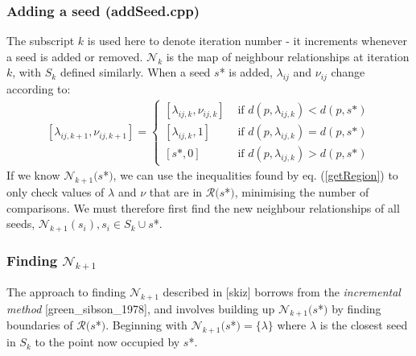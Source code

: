 \documentclass[12pt, report, a4paper, titlepage]{article}
\numberwithin{equation}{section}
\newcommand*{\citen}{}%
\DeclareRobustCommand*{\citen}[1]{%
  \begingroup
    \romannumeral-`\x %
    \setcitestyle{numbers}%
    \cite{#1}%
  \endgroup
}
\begin{document}
\subsubsection{Adding a seed (addSeed.cpp)}

The subscript $k$ is used here to denote iteration number - it increments whenever a seed is added or removed. $\mathcal{N}_k$ is the map of neighbour relationships at iteration $k$, with $S_k$ defined similarly. When a seed $s$* is added, $\lambda_{ij}$ and $\nu_{ij}$ change according to:
\begin{align}
	\left[\lambda_{ij, k+1}, \nu_{ij, k+1}\right] = \begin{cases}
		\left[\lambda_{ij, k}, \nu_{ij, k}\right] &\text{ if } d(p, \lambda_{ij, k}) < d(p, s\text{*})\\
		\left[\lambda_{ij, k}, 1 \right] &\text{ if } d(p, \lambda_{ij, k}) = d(p, s\text{*})\\
		\left[ s\text{*}, 0 \right] &\text{ if } d(p, \lambda_{ij, k}) > d(p, s\text{*})
	\end{cases}
\end{align}
If we know $\mathcal{N}_{k+1}(s$*$)$, we can use the inequalities found by eq. (\ref{getRegion}) to only check values of $\lambda$ and $\nu$ that are in $\mathcal{R}(s$*$)$, minimising the number of comparisons. We must therefore first find the new neighbour relationships of all seeds, $\mathcal{N}_{k+1}(s_i), s_i \in S_k \cup s$*.

\subsubsection{Finding $\mathcal{N}_{k+1}$}

The approach to finding $\mathcal{N}_{k+1}$ described in [\citen{skiz}] borrows from the \textit{incremental method} [\citen{green_sibson_1978}], and involves building up $\mathcal{N}_{k+1}(s$*$)$ by finding boundaries of $\mathcal{R}(s$*$)$. Beginning with $\mathcal{N}_{k+1}(s$*$) = \{\lambda\}$ where $\lambda$ is the closest seed in $S_k$ to the point now occupied by $s$*.




\newpage
\appendix


\end{document}
